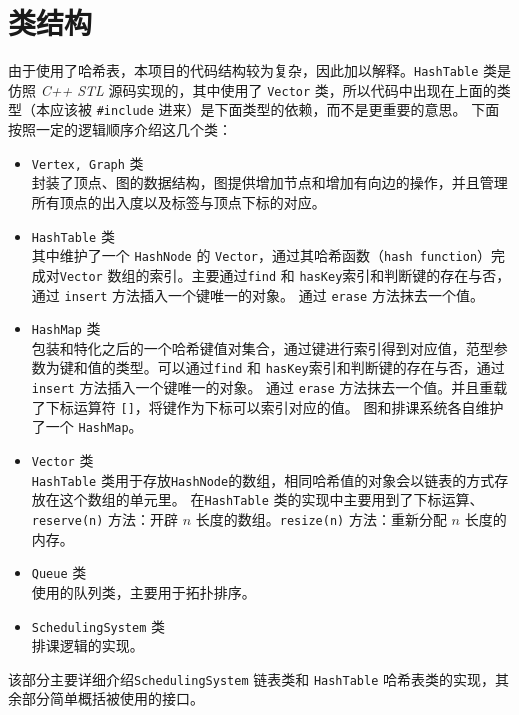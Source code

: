 
\chapter{类结构}
由于使用了哈希表，本项目的代码结构较为复杂，因此加以解释。\lstinline{HashTable} 类是仿照 \emph{C++ STL} 源码实现的，其中使用了%
\lstinline{Vector} 类，所以代码中出现在上面的类型（本应该被 \lstinline{#include} 进来）是下面类型的依赖，而不是更重要的意思。%
下面按照一定的逻辑顺序介绍这几个类：

\begin{itemize}
    \item \lstinline{Vertex, Graph} 类\\
    封装了顶点、图的数据结构，图提供增加节点和增加有向边的操作，并且管理所有顶点的出入度以及标签与顶点下标的对应。
    \item \lstinline{HashTable} 类\\
    其中维护了一个 \lstinline{HashNode} 的 \lstinline{Vector}，通过其哈希函数（\lstinline{hash function}）完成对\lstinline{Vector}%
    数组的索引。主要通过\lstinline{find} 和 \lstinline{hasKey}索引和判断键的存在与否，通过 \lstinline{insert} 方法插入一个键唯一的对象。%
    通过 \lstinline{erase} 方法抹去一个值。
    \item \lstinline{HashMap} 类\\
    包装和特化之后的一个哈希键值对集合，通过键进行索引得到对应值，范型参数为键和值的类型。可以通过\lstinline{find} 和 %
    \lstinline{hasKey}索引和判断键的存在与否，通过 \lstinline{insert} 方法插入一个键唯一的对象。%
    通过 \lstinline{erase} 方法抹去一个值。并且重载了下标运算符 \lstinline{[]}，将键作为下标可以索引对应的值。%
    图和排课系统各自维护了一个 \lstinline{HashMap}。
    \item \lstinline{Vector} 类\\
    \lstinline{HashTable} 类用于存放\lstinline{HashNode}的数组，相同哈希值的对象会以链表的方式存放在这个数组的单元里。%
    在\lstinline{HashTable} 类的实现中主要用到了下标运算、\lstinline{reserve(n)} 方法：开辟 $n$ 长度的数组。\lstinline{resize(n)}%
    方法：重新分配 $n$ 长度的内存。
    \item \lstinline{Queue} 类\\
    使用的队列类，主要用于拓扑排序。
    \item \lstinline{SchedulingSystem} 类\\
    排课逻辑的实现。
\end{itemize}

该部分主要详细介绍\lstinline{SchedulingSystem} 链表类和 \lstinline{HashTable} 哈希表类的实现，其余部分简单概括被使用的接口。


